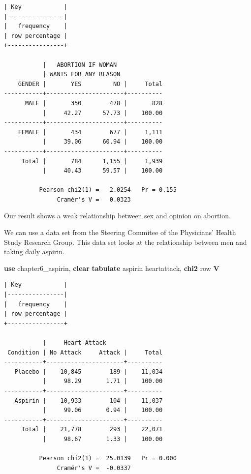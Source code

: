 \documentclass[
]{book}
\newenvironment{Shaded}{\begin{snugshade}}{\end{snugshade}}
\newcommand{\FunctionTok}[1]{\textcolor[rgb]{0.13,0.29,0.53}{\textbf{#1}}}
\newcommand{\KeywordTok}[1]{\textcolor[rgb]{0.13,0.29,0.53}{\textbf{#1}}}
\newcommand{\NormalTok}[1]{#1}
\newcommand{\OtherTok}[1]{\textcolor[rgb]{0.56,0.35,0.01}{#1}}
\begin{document}
\begin{verbatim}
| Key            |
|----------------|
|   frequency    |
| row percentage |
+----------------+

           |   ABORTION IF WOMAN
           | WANTS FOR ANY REASON
    GENDER |       YES         NO |     Total
-----------+----------------------+----------
      MALE |       350        478 |       828 
           |     42.27      57.73 |    100.00 
-----------+----------------------+----------
    FEMALE |       434        677 |     1,111 
           |     39.06      60.94 |    100.00 
-----------+----------------------+----------
     Total |       784      1,155 |     1,939 
           |     40.43      59.57 |    100.00 

          Pearson chi2(1) =   2.0254   Pr = 0.155
               Cramér's V =   0.0323
\end{verbatim}

Our result shows a weak relationship between sex and opinion on abortion.

We can use a data set from the Steering Commitee of the Physicians' Health Study Research Group. This data set looks at the relationship between men and taking daily aspirin.

\begin{Shaded}
\begin{Highlighting}[]
\KeywordTok{use}\NormalTok{ chapter6\_aspirin, }\KeywordTok{clear}
\KeywordTok{tabulate}\NormalTok{ aspirin heartattack, }\FunctionTok{chi2} \OtherTok{row} \KeywordTok{V}
\end{Highlighting}
\end{Shaded}

\begin{verbatim}
| Key            |
|----------------|
|   frequency    |
| row percentage |
+----------------+

           |     Heart Attack
 Condition | No Attack     Attack |     Total
-----------+----------------------+----------
   Placebo |    10,845        189 |    11,034 
           |     98.29       1.71 |    100.00 
-----------+----------------------+----------
   Aspirin |    10,933        104 |    11,037 
           |     99.06       0.94 |    100.00 
-----------+----------------------+----------
     Total |    21,778        293 |    22,071 
           |     98.67       1.33 |    100.00 

          Pearson chi2(1) =  25.0139   Pr = 0.000
               Cramér's V =  -0.0337
\end{verbatim}
\end{document}
